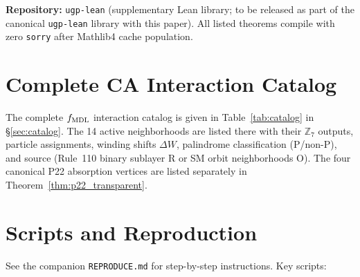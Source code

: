 \documentclass[11pt]{article}
\theoremstyle{remark}
\begin{document}
\begin{appendices}
\textbf{Repository:} \texttt{ugp-lean} (supplementary Lean library; to be
released as part of the canonical \texttt{ugp-lean} library with this paper).
All listed theorems compile with zero \texttt{sorry} after
Mathlib4 cache population.

\section{Complete CA Interaction Catalog}
\label{app:catalog}

The complete $f_{\rm MDL}$ interaction catalog is given in Table~\ref{tab:catalog}
in \S\ref{sec:catalog}.
The 14 active neighborhoods are listed there with their $\mathbb{Z}_7$ outputs,
particle assignments, winding shifts $\Delta W$, palindrome classification
(P/non-P), and source (Rule~110 binary sublayer R or SM orbit neighborhoods O).
The four canonical P22 absorption vertices are listed separately in
Theorem~\ref{thm:p22_transparent}.

\section{Scripts and Reproduction}
\label{app:repro}

See the companion \texttt{REPRODUCE.md} for step-by-step instructions.
Key scripts:


\end{appendices}
\end{document}
